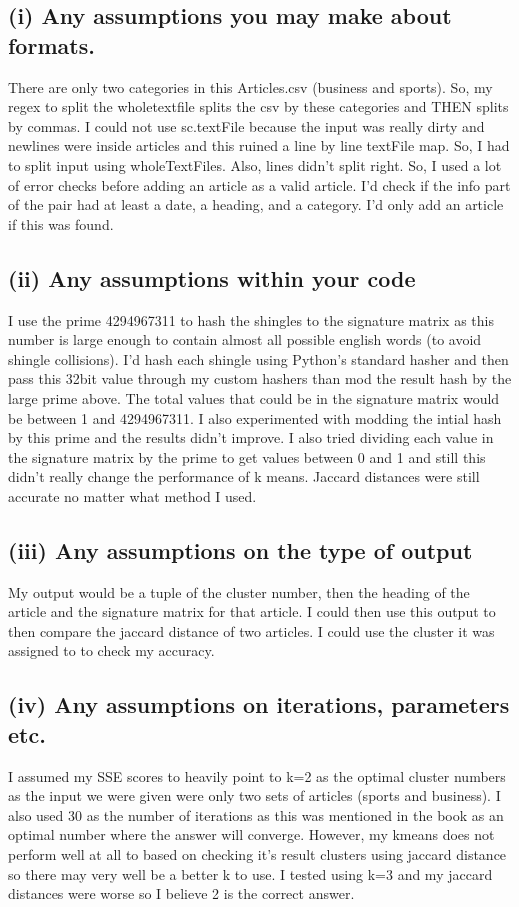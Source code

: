 \subsection*{(i) Any assumptions you may make about formats.}
There are only two categories in this Articles.csv (business and sports). So, my regex to split the wholetextfile splits the csv by these categories and THEN splits by commas. I could not use sc.textFile because the input was really dirty and newlines were inside articles and this ruined a line by line textFile map. So, I had to split input using wholeTextFiles. Also, lines didn't split right. So, I used a lot of error checks before adding an article as a valid article. I'd check if the info part of the pair had at least a date, a heading, and a category. I'd only add an article if this was found. 

\subsection*{(ii) Any assumptions within your code}
I use the prime 4294967311 to hash the shingles to the signature matrix as this number is large enough to contain almost all possible english words (to avoid shingle collisions). I'd hash each shingle using Python's standard hasher and then pass this 32bit value through my custom hashers than mod the result hash by the large prime above. The total values that could be in the signature matrix would be between 1 and 4294967311. I also experimented with modding the intial hash by this prime and the results didn't improve. I also tried dividing each value in the signature matrix by the prime to get values between 0 and 1 and still this didn't really change the performance of k means. Jaccard distances were still accurate no matter what method I used. 

\subsection*{(iii) Any assumptions on the type of output}
My output would be a tuple of the cluster number, then the heading of the article and the signature matrix for that article. I could then use this output to then compare the jaccard distance of two articles. I could use the cluster it was assigned to to check my accuracy.

\subsection*{(iv) Any assumptions on iterations, parameters etc.}
I assumed my SSE scores to heavily point to k=2 as the optimal cluster numbers as the input we were given were only two sets of articles (sports and business). I also used 30 as the number of iterations as this was mentioned in the book as an optimal number where the answer will converge. However, my kmeans does not perform well at all to based on checking it's result clusters using jaccard distance so there may very well be a better k to use.  I tested using k=3 and my jaccard distances were worse so I believe 2 is the correct answer. 

